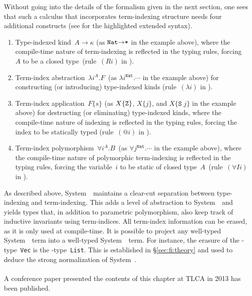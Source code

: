 Without going into the details of the formalism given in the next section,
one sees that such a calculus that incorporates term-indexing
structure needs four additional constructs (see  for the
highlighted extended syntax).
\begin{enumerate}
\item
  Type-indexed kind~$A\to\kappa$
  (as $\texttt{{Nat}\ensuremath{\to}*}$ in the example above), where
  the compile-time nature of term-indexing is reflected in the typing rules,
  forcing $A$ to be a closed type~(rule~$(Ri)$ in ).

\item 
  Term-index abstraction~$\lambda i^A.F$~(as
  $\lambda i^{\texttt{{Nat}}}.\cdots$ in the example above) for constructing
  (or introducing) type-indexed kinds (rule~$(\lambda i)$ in ).

\item 
  Term-index application~$F\{s\}$ (as $X\{{\tt Z}\}$, $X\{j\}$, and
  $X\{\texttt{S}\;j\}$ in the example above) for destructing (or
  eliminating) type-indexed kinds, where the compile-time nature of
  indexing is reflected in the typing rules, forcing the index to be
  statically typed (rule~$(@i)$ in ).

\item
  Term-index polymorphism~$\forall i^A.B$~(as
  $\forall j^{\texttt{{Nat}}}.\cdots$ in the example above),
  where the compile-time nature of polymorphic term-indexing
  is reflected in the typing rules, forcing the variable~$i$
  to be static of closed type~$A$~(rule~$(\forall Ii)$ in ).
\end{enumerate}

As described above, System~\Fi\ maintains a clear-cut separation between
type-indexing and term-indexing.  This adds a level of abstraction
to System~\Fw\ and yields types that, in addition to parametric polymorphism,
also keep track of inductive invariants using term-indices. All term-index
information can be erased, as it is only used at compile-time.  
It is possible to project any well-typed System~\Fi\ term into
a well-typed System~\Fw\ term.
For instance, the erasure of the \Fi-type~\texttt{Vec}
is the \Fw-type~\texttt{List}.  This is established in
\S\ref{sec:fi:theory} and used to deduce the strong normalization of
System~\Fi.

\paragraph{}
A conference paper \cite{AhnSheFioPit13} presented the contents of this chapter
at TLCA in 2013 has been published.






